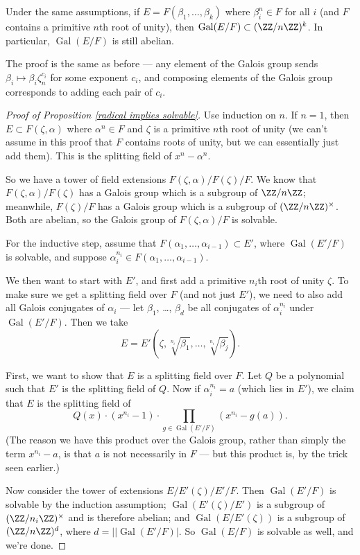 \begin{lemma}
Under the same assumptions, if $E = F(\beta_1, \ldots, \beta_k)$ where $\beta_i^n \in F$ for all $i$ (and $F$ contains a primitive $n$th root of unity), then $\operatorname{Gal}(E/F) \subset (\ZZ/n\ZZ)^k$. In particular, $\operatorname{Gal}(E/F)$ is still abelian. 
\end{lemma}

The proof is the same as before --- any element of the Galois group sends $\beta_i \mapsto \beta_i\zeta_n^{c_i}$ for some exponent $c_i$, and composing elements of the Galois group corresponds to adding each pair of $c_i$. 

\begin{proof}[Proof of Proposition \ref{radical implies solvable}]
    Use induction on $n$. If $n = 1$, then $E \subset F(\zeta, \alpha)$ where $\alpha^n \in F$ and $\zeta$ is a primitive $n$th root of unity (we can't assume in this proof that $F$ contains roots of unity, but we can essentially just add them). This is the splitting field of $x^n - \alpha^n$. 

    So we have a tower of field extensions $F(\zeta, \alpha)/F(\zeta)/F$. We know that $F(\zeta, \alpha)/F(\zeta)$ has a Galois group which is a subgroup of $\ZZ/n\ZZ$; meanwhile, $F(\zeta)/F$ has a Galois group which is a subgroup of $(\ZZ/n\ZZ)^\times$. Both are abelian, so the Galois group of $F(\zeta, \alpha)/F$ is solvable. 

    For the inductive step, assume that $F(\alpha_1, \ldots, \alpha_{i - 1}) \subset E'$, where $\operatorname{Gal}(E'/F)$ is solvable, and suppose $\alpha_i^{n_i} \in F(\alpha_1, \ldots, \alpha_{i - 1})$. 
    
    We then want to start with $E'$, and first add a primitive $n_i$th root of unity $\zeta$. To make sure we get a splitting field over $F$ (and not just $E'$), we need to also add all Galois conjugates of $\alpha_i$ --- let $\beta_1$, \ldots, $\beta_d$ be all conjugates of $\alpha_i^{n_i}$ under $\operatorname{Gal}(E'/F)$. Then we take \[E = E'(\zeta, \sqrt[n_i]{\beta_1}, \ldots, \sqrt[n_i]{\beta_j}).\] 
    
    First, we want to show that $E$ is a splitting field over $F$. Let $Q$ be a polynomial such that $E'$ is the splitting field of $Q$. Now if $\alpha_i^{n_i} = a$ (which lies in $E'$), we claim that $E$ is the splitting field of \[Q(x)\cdot (x^{n_i} - 1)\cdot \prod_{g \in \operatorname{Gal}(E'/F)} (x^{n_i} - g(a)).\] (The reason we have this product over the Galois group, rather than simply the term $x^{n_i} - a$, is that $a$ is not necessarily in $F$ --- but this product is, by the trick seen earlier.)  
    
    Now consider the tower of extensions $E/E'(\zeta)/E'/F$. Then $\operatorname{Gal}(E'/F)$ is solvable by the induction assumption; $\operatorname{Gal}(E'(\zeta)/E')$ is a subgroup of $(\ZZ/n_i\ZZ)^\times$ and is therefore abelian; and $\operatorname{Gal}(E/E'(\zeta))$ is a subgroup of $(\ZZ/n\ZZ)^d$, where $d = \lvert| \operatorname{Gal}(E'/F)\rvert$. So $\operatorname{Gal}(E/F)$ is solvable as well, and we're done. 
\end{proof}


